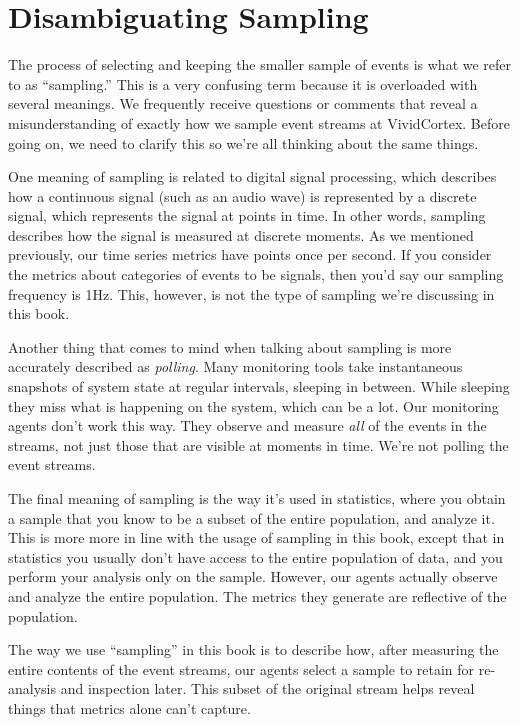 \documentclass{vivid_layout}
\begin{document}
\section{Disambiguating Sampling}

The process of selecting and keeping the smaller sample of events is what we refer to
as ``sampling.'' This is a very confusing term because it is overloaded with
several meanings. We frequently receive questions or comments that reveal a
misunderstanding of exactly how we sample event streams at VividCortex. Before
going on, we need to clarify this so we're all thinking about the same things.

One meaning of sampling is related to digital signal processing, which describes
how a continuous signal (such as an audio wave) is represented by a discrete
signal, which represents the signal at points in time. In other words, sampling
describes how the signal is measured at discrete moments. As we mentioned
previously, our time series metrics have points once per second. If you consider
the metrics about categories of events to be signals, then you'd say our
sampling frequency is 1Hz.  This, however, is not the type of sampling we're
discussing in this book.

Another thing that comes to mind when talking about sampling is more accurately
described as \emph{polling}. Many monitoring tools take instantaneous snapshots
of system state at regular intervals, sleeping in between. While sleeping they
miss what is happening on the system, which can be a lot.  Our monitoring agents
don't work this way. They observe and measure \emph{all} of the events in the
streams, not just those that are visible at moments in time. We're not polling
the event streams.

The final meaning of sampling is the way it's used in statistics, where you
obtain a sample that you know to be a subset of the entire population, and
analyze it. This is more more in line with the usage of sampling in this book,
except that in statistics you usually don't have access to the entire population
of data, and you perform your analysis only on the sample. However, our agents
actually observe and analyze the entire population. The metrics they generate
are reflective of the population.

The way we use ``sampling'' in this book is to describe how, after measuring the
entire contents of the event streams, our agents select a sample to retain for
re-analysis and inspection later. This subset of the original stream helps
reveal things that metrics alone can't capture.
\end{document}

